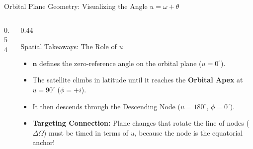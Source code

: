 \documentclass[aspectratio=169,10pt]{beamer}
\begin{document}
\begin{frame}{Orbital Plane Geometry: Visualizing the Angle \texorpdfstring{$u = \omega + \theta$}{u = omega + theta}}
\begin{columns}[c]
\begin{column}{0.54\textwidth}
        \end{column}

        \begin{column}{0.44\textwidth}
            \begin{block}{Spatial Takeaways: The Role of $u$}
                \footnotesize
                \begin{itemize}\setlength{\itemsep}{4pt}
                    \item $\mathbf{n}$ defines the zero-reference angle on the orbital plane ($u = 0^\circ$).
                    \item The satellite climbs in latitude until it reaches the \textbf{Orbital Apex} at $u = 90^\circ$ ($\phi = +i$).
                    \item It then descends through the Descending Node ($u = 180^\circ$, $\phi = 0^\circ$).
                    \item \textbf{Targeting Connection:} Plane changes that rotate the line of nodes ($\Delta\Omega$) must be timed in terms of $u$, because the node is the equatorial anchor!
                \end{itemize}
            \end{block}
        \end{column}
    \end{columns}
\end{frame}
\end{document}
